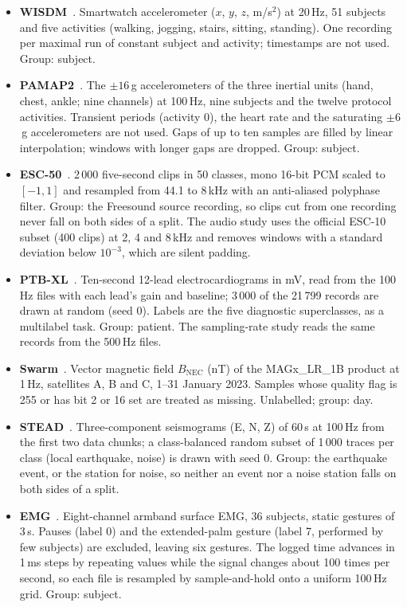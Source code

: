\documentclass[preprint,12pt]{elsarticle}
\begin{document}
\begin{itemize}
\item \textbf{WISDM}~\cite{misc_wisdm_smartphone_and_smartwatch_activity_and_biometrics_dataset__507}. Smartwatch accelerometer ($x$, $y$, $z$, m/s$^2$) at 20\,Hz, 51 subjects and five activities (walking, jogging, stairs, sitting, standing). One recording per maximal run of constant subject and activity; timestamps are not used. Group: subject.
\item \textbf{PAMAP2}~\cite{reiss2012pamap2}. The $\pm16$\,g accelerometers of the three inertial units (hand, chest, ankle; nine channels) at 100\,Hz, nine subjects and the twelve protocol activities. Transient periods (activity 0), the heart rate and the saturating $\pm6$\,g accelerometers are not used. Gaps of up to ten samples are filled by linear interpolation; windows with longer gaps are dropped. Group: subject.
\item \textbf{ESC-50}~\cite{piczak2015esc}. 2\,000 five-second clips in 50 classes, mono 16-bit PCM scaled to $[-1,1]$ and resampled from 44.1 to 8\,kHz with an anti-aliased polyphase filter. Group: the Freesound source recording, so clips cut from one recording never fall on both sides of a split. The audio study uses the official ESC-10 subset (400 clips) at 2, 4 and 8\,kHz and removes windows with a standard deviation below $10^{-3}$, which are silent padding.
\item \textbf{PTB-XL}~\cite{wagner2020ptbxl}. Ten-second 12-lead electrocardiograms in mV, read from the 100\,Hz files with each lead's gain and baseline; 3\,000 of the 21\,799 records are drawn at random (seed 0). Labels are the five diagnostic superclasses, as a multilabel task. Group: patient. The sampling-rate study reads the same records from the 500\,Hz files.
\item \textbf{Swarm}~\cite{friis2006swarm}. Vector magnetic field $B_{\mathrm{NEC}}$ (nT) of the MAGx\_LR\_1B product at 1\,Hz, satellites A, B and C, 1--31 January 2023. Samples whose quality flag is 255 or has bit 2 or 16 set are treated as missing. Unlabelled; group: day.
\item \textbf{STEAD}~\cite{mousavi2019stead}. Three-component seismograms (E, N, Z) of 60\,s at 100\,Hz from the first two data chunks; a class-balanced random subset of 1\,000 traces per class (local earthquake, noise) is drawn with seed 0. Group: the earthquake event, or the station for noise, so neither an event nor a noise station falls on both sides of a split.
\item \textbf{EMG}~\cite{krilova2018emg}. Eight-channel armband surface EMG, 36 subjects, static gestures of 3\,s. Pauses (label 0) and the extended-palm gesture (label 7, performed by few subjects) are excluded, leaving six gestures. The logged time advances in 1\,ms steps by repeating values while the signal changes about 100 times per second, so each file is resampled by sample-and-hold onto a uniform 100\,Hz grid. Group: subject.
\end{itemize}
\end{document}
